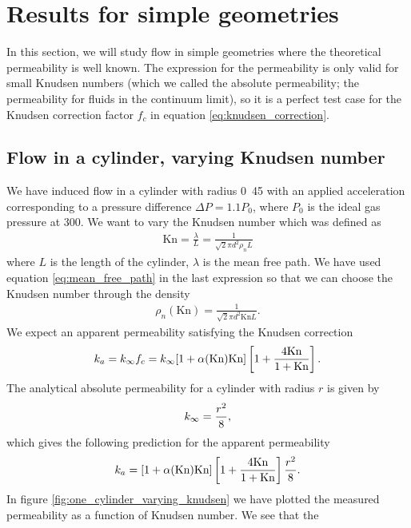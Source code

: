 \section{Results for simple geometries}
\label{sec:results_for_simple_geometries}
In this section, we will study flow in simple geometries where the theoretical permeability is well known. The expression for the permeability is only valid for small Knudsen numbers (which we called the absolute permeability; the permeability for fluids in the continuum limit), so it is a perfect test case for the Knudsen correction factor $f_c$ in equation \eqref{eq:knudsen_correction}. 

\subsection{Flow in a cylinder, varying Knudsen number}
We have induced flow in a cylinder with radius \unit{0.45}{\micro\meter} with an applied acceleration corresponding to a pressure difference $\Delta P = 1.1P_0$, where $P_0$ is the ideal gas pressure at \unit{300}{\kelvin}. We want to vary the Knudsen number which was defined as
\begin{align}
	\text{Kn} = \frac{\lambda}{L} = \frac{1}{\sqrt 2 \pi d^2 \rho_n L}
\end{align}
where $L$ is the length of the cylinder, $\lambda$ is the mean free path. We have used equation \eqref{eq:mean_free_path} in the last expression so that we can choose the Knudsen number through the density
\begin{align}
	\rho_n(\text{Kn}) = \frac{1}{\sqrt 2 \pi d^2 \text{Kn}L}.
\end{align}
We expect an apparent permeability satisfying the Knudsen correction
\begin{align}
	k_a = k_\infty f_c = k_\infty[1 + \alpha(\text{Kn})\text{Kn}]\left[1 + {4\text{Kn}\over 1 + \text{Kn}}\right].
\end{align}
The analytical absolute permeability for a cylinder with radius $r$ is given by\cite{karniadakis2005microflows}
\begin{align}
	\label{eq:permeability_cylinder}
	k_\infty = {r^2\over 8},
\end{align}
which gives the following prediction for the apparent permeability
\begin{align}
	k_a = [1 + \alpha(\text{Kn})\text{Kn}]\left[1 + {4\text{Kn}\over 1 + \text{Kn}}\right] {r^2\over 8}.
\end{align}
In figure \ref{fig:one_cylinder_varying_knudsen} we have plotted the measured permeability as a function of Knudsen number. We see that the 

